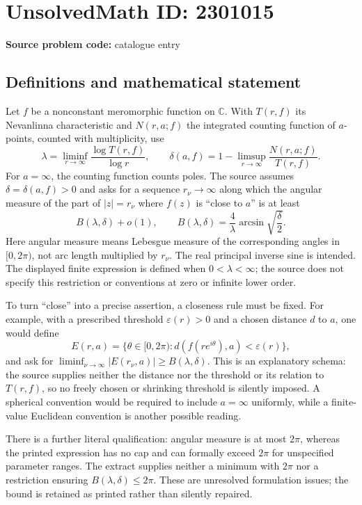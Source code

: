 \documentclass[11pt]{article}
\newcommand{\C}{\mathbb{C}}
\newcommand{\eps}{\varepsilon}
\begin{document}
\section*{UnsolvedMath ID: 2301015}
\textbf{Source problem code:} catalogue entry
\subsection{Definitions and mathematical statement}
Let $f$ be a nonconstant meromorphic function on $\C$. With $T(r,f)$ its Nevanlinna characteristic and $N(r,a;f)$ the integrated counting function of $a$-points, counted with multiplicity, use
\[
\lambda=\liminf_{r\to\infty}\frac{\log T(r,f)}{\log r},\qquad
\delta(a,f)=1-\limsup_{r\to\infty}\frac{N(r,a;f)}{T(r,f)}.
\]
For $a=\infty$, the counting function counts poles. The source assumes $\delta=\delta(a,f)>0$ and asks for a sequence $r_\nu\to\infty$ along which the angular measure of the part of $|z|=r_\nu$ where $f(z)$ is ``close to $a$'' is at least
\[
B(\lambda,\delta)+o(1),\qquad
B(\lambda,\delta)=\frac{4}{\lambda}\arcsin\sqrt{\frac{\delta}{2}}.
\]
Here angular measure means Lebesgue measure of the corresponding angles in $[0,2\pi)$, not arc length multiplied by $r_\nu$. The real principal inverse sine is intended. The displayed finite expression is defined when $0<\lambda<\infty$; the source does not specify this restriction or conventions at zero or infinite lower order.

To turn ``close'' into a precise assertion, a closeness rule must be fixed. For example, with a prescribed threshold $\eps(r)>0$ and a chosen distance $d$ to $a$, one would define
\[
E(r,a)=\{\theta\in[0,2\pi):d(f(re^{i\theta}),a)<\eps(r)\},
\]
and ask for $\liminf_{\nu\to\infty}|E(r_\nu,a)|\ge B(\lambda,\delta)$. This is an explanatory schema: the source supplies neither the distance nor the threshold or its relation to $T(r,f)$, so no freely chosen or shrinking threshold is silently imposed. A spherical convention would be required to include $a=\infty$ uniformly, while a finite-value Euclidean convention is another possible reading.

There is a further literal qualification: angular measure is at most $2\pi$, whereas the printed expression has no cap and can formally exceed $2\pi$ for unspecified parameter ranges. The extract supplies neither a minimum with $2\pi$ nor a restriction ensuring $B(\lambda,\delta)\le2\pi$. These are unresolved formulation issues; the bound is retained as printed rather than silently repaired.
\end{document}

